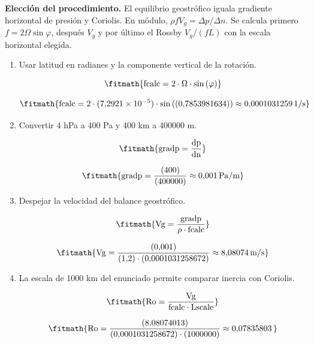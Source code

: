 \noindent\textbf{Elección del procedimiento.} El equilibrio geostrófico iguala gradiente horizontal de presión y Coriolis. En módulo, $\rho fV_g=\Delta p/\Delta n$. Se calcula primero $f=2\Omega\sin\varphi$, después $V_g$ y por último el Rossby $V_g/(fL)$ con la escala horizontal elegida.

\begin{enumerate}

\item Usar latitud en radianes y la componente vertical de la rotación.

\[\fitmath{\mathrm{fcalc}=2\cdot \Omega\cdot \sin\left(\varphi\right)}\]

\[\fitmath{\mathrm{fcalc}=2\cdot (7{,}2921\times10^{-5})\cdot \sin\left((0{,}7853981634)\right)\approx 0{,}0001031259\,\mathrm{1/s}}\]

\item Convertir 4 hPa a 400 Pa y 400 km a 400000 m.

\[\fitmath{\mathrm{gradp}=\frac{\mathrm{dp}}{\mathrm{dn}}}\]

\[\fitmath{\mathrm{gradp}=\frac{(400)}{(400000)}\approx 0{,}001\,\mathrm{Pa/m}}\]

\item Despejar la velocidad del balance geostrófico.

\[\fitmath{\mathrm{Vg}=\frac{\mathrm{gradp}}{\rho\cdot \mathrm{fcalc}}}\]

\[\fitmath{\mathrm{Vg}=\frac{(0{,}001)}{(1{,}2)\cdot (0{,}0001031258672)}\approx 8{,}08074\,\mathrm{m/s}}\]

\item La escala de 1000 km del enunciado permite comparar inercia con Coriolis.

\[\fitmath{\mathrm{Ro}=\frac{\mathrm{Vg}}{\mathrm{fcalc}\cdot \mathrm{Lscale}}}\]

\[\fitmath{\mathrm{Ro}=\frac{(8{,}08074013)}{(0{,}0001031258672)\cdot (1000000)}\approx 0{,}07835803\,}\]

\end{enumerate}
